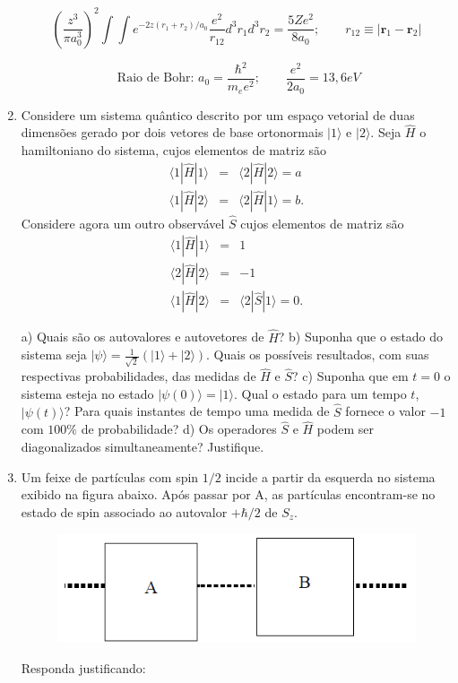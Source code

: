 \begin{enumerate}[start=1,label={\bfseries Q\arabic*.}]
$$
\left(\frac{z^{3}}{\pi a_{0}^{3}} \right)^{2} \int \int e^{-2z(r_{1}+r_{2})/a_{0}} \frac{e^{2}}{r_{12}} d^{3} r_{1} d^{3} r_{2} = \frac{5Ze^{2}}{8a_{0}}; \quad \quad r_{12} \equiv | \mathbf{r}_{1} - \mathbf{r}_{2}|
$$

$$
\mbox{ Raio de Bohr: } a_{0} = \frac{\hbar^{2}}{m_{e}e^{2}};  \quad \quad \frac{e^{2}}{2a_{0}} = 13,6 eV
$$


\item Considere um sistema quântico descrito por um espaço vetorial de duas dimensões gerado por dois vetores de base ortonormais $|1\rangle$ e $|2\rangle$. Seja $\hat{H}$ o hamiltoniano do sistema, cujos elementos de matriz são
\begin{eqnarray*}
\langle 1 | \hat{H} | 1 \rangle & = & \langle 2 | \hat{H} | 2 \rangle  = a \\
\langle 1 | \hat{H} | 2 \rangle  & = & \langle 2 | \hat{H} | 1 \rangle  = b.
\end{eqnarray*}
Considere agora um outro observável $\hat{S}$ cujos elementos de matriz são
\begin{eqnarray*}
\langle 1 | \hat{H} | 1 \rangle & = & 1 \\
\langle 2 | \hat{H} | 2 \rangle  & = & -1 \\
\langle 1 | \hat{H} | 2 \rangle  & = & \langle 2 | \hat{S} | 1 \rangle = 0.
\end{eqnarray*}

a) Quais são os autovalores e autovetores de $\hat{H}$?
b) Suponha que o estado do sistema seja $| \psi \rangle = \frac{1}{\sqrt{2}}  \left( |1\rangle + |2\rangle \right)$. Quais os possíveis resultados, com suas respectivas probabilidades, das medidas de $\hat{H}$ e $\hat{S}$?
c) Suponha que em $t = 0$ o sistema esteja no estado $|\psi(0) \rangle = |1\rangle$. Qual o estado para um tempo $t$, $|\psi(t)\rangle$? Para quais instantes de tempo uma medida de $\hat{S}$ fornece o valor $-1$ com $100\%$ de probabilidade?
d) Os operadores $\hat{S}$ e $\hat{H}$ podem ser diagonalizados simultaneamente? Justifique.




\item Um feixe de partículas com spin $1/2$ incide a partir da esquerda no sistema exibido na figura abaixo. Após passar por A, as partículas encontram-se no estado de spin associado ao autovalor $+ \hbar/2$ de $S_{z}$.
\begin{figure}
  \centering
  \includegraphics[scale=0.7]{quantica-img/aparato.png}
\end{figure}
Responda justificando:


\end{enumerate}
